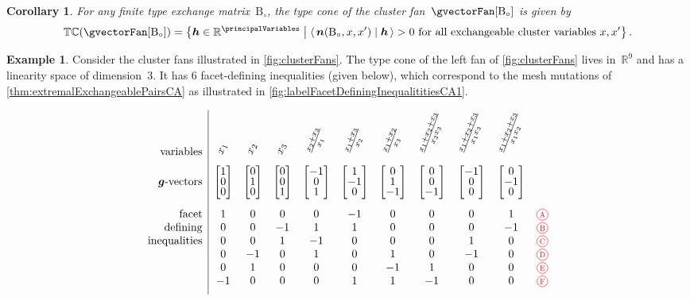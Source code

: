 \documentclass{amsart}
\newtheorem{corollary}[theorem]{Corollary}
\theoremstyle{definition}
\newtheorem{example}[theorem]{Example}
\newcommand{\R}{\mathbb{R}} %
\renewcommand{\b}[1]{{\boldsymbol{#1}}} %
\newcommand{\set}[2]{\left\{ #1 \;\middle|\; #2 \right\}} %
\newcommand{\dotprod}[2]{\left\langle \, #1 \; \middle| \; #2 \, \right\rangle} %
\newcommand{\red}{\color{red}} %
\newcommand*\circled[1]{\tikz[baseline=(char.base)]{\node[shape=circle, draw, inner sep=1.5pt, scale=.7] (char) {#1};}}
\newcommand{\compactVectorT}[3]{\begin{bmatrix} #1 \\[-.1cm] #2 \\[-.1cm] #3 \end{bmatrix}}
\newcommand{\typeCone}{\mathbb{TC}} %
\newcommand{\B}{\mathrm{B}} %
\begin{document}
\begin{corollary}
\label{coro:typeConeCA}
For any finite type exchange matrix~$\B_\circ$, the type cone of the cluster fan~$\gvectorFan[\B_\circ]$ is given by
\[
\typeCone(\gvectorFan[\B_\circ]) = \set{\b{h} \in \R^{\principalVariables}}{\dotprod{\b{n}(\B_\circ, x, x')}{\b{h}} > 0 \text{ for all exchangeable cluster variables } x, x'}.
\]
\end{corollary}

\begin{example}
\label{exm:typeConeCA}
Consider the cluster fans illustrated in \cref{fig:clusterFans}.
The type cone of the left fan of \cref{fig:clusterFans} lives in~$\R^9$ and has a linearity space of dimension~$3$.
It has $6$ facet-defining inequalities (given below), which correspond to the mesh mutations of \cref{thm:extremalExchangeablePairsCA} as illustrated in \cref{fig:labelFacetDefiningInequalititiesCA1}.

\[
\begin{array}{r|cccccccccc}
\text{variables} & \rotatebox{70}{$x_1$} & \rotatebox{70}{$x_2$} & \rotatebox{70}{$x_3$} & \rotatebox{70}{$\frac{x_2 + x_3}{x_1}$} & \rotatebox{70}{$\frac{x_1 + x_3}{x_2}$} & \rotatebox{70}{$\frac{x_1 + x_2}{x_3}$} & \rotatebox{70}{$\frac{x_1 + x_2 + x_3}{x_2 x_3}$} & \rotatebox{70}{$\frac{x_1 + x_2 + x_3}{x_1 x_3}$} & \rotatebox{70}{$\frac{x_1 + x_2 + x_3}{x_1 x_2}$} \\[.2cm]
\text{$\b{g}$-vectors} & \compactVectorT{1}{0}{0} & \compactVectorT{0}{1}{0} & \compactVectorT{0}{0}{1} & \compactVectorT{-1}{0}{1} & \compactVectorT{1}{-1}{0} & \compactVectorT{0}{1}{-1} & \compactVectorT{0}{0}{-1} & \compactVectorT{-1}{0}{0} & \compactVectorT{0}{-1}{0} \\[.6cm]
\text{facet} 		& 1 & 0 & 0 & 0 & -1 & 0 & 0 & 0 & 1 & \red \circled{A} \\
\text{defining}		& 0 & 0 & -1 & 1 & 1 & 0 & 0 & 0 & -1 & \red \circled{B} \\
\text{inequalities}	& 0 & 0 & 1 & -1 & 0 & 0 & 0 & 1 & 0 & \red \circled{C} \\
 					& 0 & -1 & 0 & 1 & 0 & 1 & 0 & -1 & 0 & \red \circled{D} \\
 					& 0 & 1 & 0 & 0 & 0 & -1 & 1 & 0 & 0 & \red \circled{E} \\
					& -1 & 0 & 0 & 0 & 1 & 1 & -1 & 0 & 0 & \red \circled{F} \\[.2cm]
\end{array}
\]


\end{example}
\end{document}
